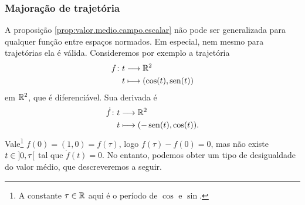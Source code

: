 \begin{comment}

Em espaços normados, conjuntos conexos são conexos por caminhos e em particular todos pontos do conjunto podem ser conectados por um caminho poligonal. Usaremos esse fato na seguinte proposição.

\begin{proposition}
\label{prop:campo.diferenciavel.constante}
Sejam $\bm E$ um espaço normado, $A \subseteq E$ aberto e conexo e $\fun{f}{A}{\R}$ um campo escalar diferenciável. %
Se $\D f = 0$, então $f$ é constante.
\end{proposition}
\begin{proof}
Sejam $v,v' \in A$. Como $A$ é conexo, alguma trajetória poligonal $\fun{\gamma}{\intff{0}{1}}{A}$ conecta $v$ a $v'$; ou seja, $\gamma(0)=v$, $\gamma(1)=v'$ e alguma $n$-partição por intervalos $(t_k)_{k \in [n+1]} \in \R^{n+1}$ satisfaz, para todo $k \in [n]$, que $\gamma|_{\intff{t_k}{t_{k+1}}}$ é afim e $\gamma(\intff{t_k}{t_{k+1}}) = \Sxger{\gamma(t_k),\gamma(t_{k+1})}$. Assim, como para todo $x \in A$ vale $\D f|_x = 0$, então segue de \ref{prop:valor.medio.campo.escalar} que, para todo $k \in [n]$ vale
	\begin{equation*}
	f(\gamma(t_{k+1})) - f(\gamma(t_k)) = 0.
	\end{equation*}
Por indução em $n$, obtemos que $f(\gamma(t_0)) = f(\gamma(t_n))$; ou seja,
	\begin{equation*}
	f(v) = f(\gamma(0)) = f(\gamma(t_0)) = f(\gamma(t_n)) = f(\gamma(1)) = f(v'),
	\end{equation*}
o que mostra que $f$ é constante.
\end{proof}

\end{comment}

\subsubsection{Majoração de trajetória}


A proposição \ref{prop:valor.medio.campo.escalar} não pode ser generalizada para qualquer função entre espaços normados. Em especial, nem mesmo para trajetórias ela é válida. Consideremos por exemplo a trajetória
	\begin{align*}
	{f}\colon {t} &\longrightarrow {\mathbb{R}^2} \\{t} &\longmapsto (\cos(t), \operatorname{sen}(t))
	\end{align*}
em $\mathbb{R}^2$, que é diferenciável. Sua derivada é
	\begin{align*}
	{\dot f}\colon {t} &\longrightarrow {\mathbb{R}^2} \\{t} &\longmapsto (-\operatorname{sen}(t), \cos(t)).
	\end{align*}
Vale\footnote{
	A constante $\tau \in \mathbb{R}$ aqui é o período de $\cos$ e $\sin$.
}
$f(0) = (1,0) = f(\tau)$, logo $f(\tau) - f(0) = 0$, mas não existe $t \in \left]0,\allowbreak \tau\right[$ tal que $\dot f(t) = 0$. No entanto, podemos obter um tipo de desigualdade do valor médio, que descreveremos a seguir.

